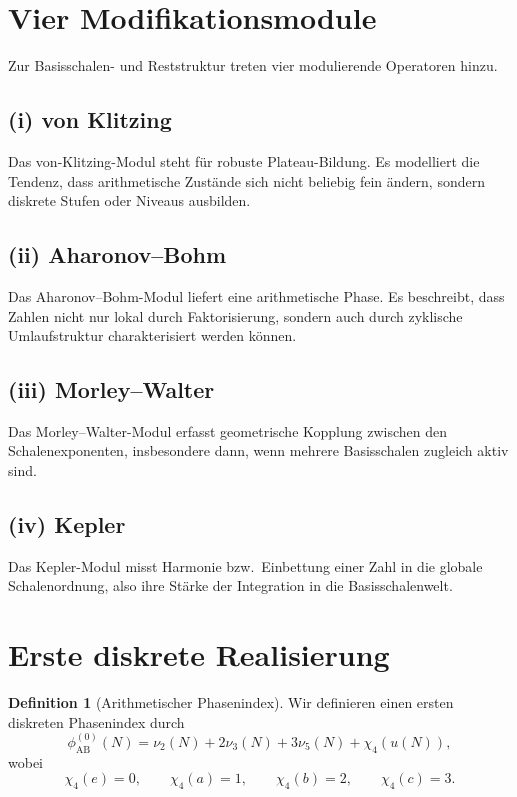 \documentclass[11pt,a4paper]{article}
\theoremstyle{plain}
\theoremstyle{definition}
\newtheorem{definition}{Definition}
\theoremstyle{remark}
\begin{document}
\section{Vier Modifikationsmodule}

Zur Basisschalen- und Reststruktur treten vier modulierende Operatoren hinzu.

\subsection*{(i) von Klitzing}
Das von-Klitzing-Modul steht für robuste Plateau-Bildung. 
Es modelliert die Tendenz, dass arithmetische Zustände sich nicht beliebig fein ändern, sondern diskrete Stufen oder Niveaus ausbilden.

\subsection*{(ii) Aharonov--Bohm}
Das Aharonov--Bohm-Modul liefert eine arithmetische Phase. 
Es beschreibt, dass Zahlen nicht nur lokal durch Faktorisierung, sondern auch durch zyklische Umlaufstruktur charakterisiert werden können.

\subsection*{(iii) Morley--Walter}
Das Morley--Walter-Modul erfasst geometrische Kopplung zwischen den Schalenexponenten, insbesondere dann, wenn mehrere Basisschalen zugleich aktiv sind.

\subsection*{(iv) Kepler}
Das Kepler-Modul misst Harmonie bzw.\ Einbettung einer Zahl in die globale Schalenordnung, also ihre Stärke der Integration in die Basisschalenwelt.

\section{Erste diskrete Realisierung}

\begin{definition}[Arithmetischer Phasenindex]
Wir definieren einen ersten diskreten Phasenindex durch
\[
\phi_{\mathrm{AB}}^{(0)}(N)
=
\nu_2(N)+2\nu_3(N)+3\nu_5(N)+\chi_4(u(N)),
\]
wobei
\[
\chi_4(e)=0,\qquad
\chi_4(a)=1,\qquad
\chi_4(b)=2,\qquad
\chi_4(c)=3.
\]
\end{definition}
\end{document}
